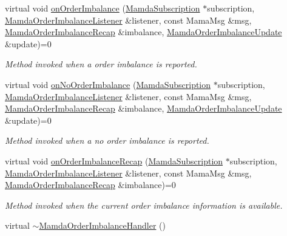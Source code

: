 \begin{CompactItemize}
\item 
virtual void \hyperlink{classWombat_1_1MamdaOrderImbalanceHandler_9c64bc280a746560b36a2a891db8a68f}{on\-Order\-Imbalance} (\hyperlink{classWombat_1_1MamdaSubscription}{Mamda\-Subscription} $\ast$subscription, \hyperlink{classWombat_1_1MamdaOrderImbalanceListener}{Mamda\-Order\-Imbalance\-Listener} \&listener, const Mama\-Msg \&msg, \hyperlink{classWombat_1_1MamdaOrderImbalanceRecap}{Mamda\-Order\-Imbalance\-Recap} \&imbalance, \hyperlink{classWombat_1_1MamdaOrderImbalanceUpdate}{Mamda\-Order\-Imbalance\-Update} \&update)=0
\begin{CompactList}\small\item\em Method invoked when a order imbalance is reported. \item\end{CompactList}\item 
virtual void \hyperlink{classWombat_1_1MamdaOrderImbalanceHandler_f1b804e726d1cb782ebb0e4cbf8461b2}{on\-No\-Order\-Imbalance} (\hyperlink{classWombat_1_1MamdaSubscription}{Mamda\-Subscription} $\ast$subscription, \hyperlink{classWombat_1_1MamdaOrderImbalanceListener}{Mamda\-Order\-Imbalance\-Listener} \&listener, const Mama\-Msg \&msg, \hyperlink{classWombat_1_1MamdaOrderImbalanceRecap}{Mamda\-Order\-Imbalance\-Recap} \&imbalance, \hyperlink{classWombat_1_1MamdaOrderImbalanceUpdate}{Mamda\-Order\-Imbalance\-Update} \&update)=0
\begin{CompactList}\small\item\em Method invoked when a no order imbalance is reported. \item\end{CompactList}\item 
virtual void \hyperlink{classWombat_1_1MamdaOrderImbalanceHandler_4723195ebde988b95b39f58b2ab0b77e}{on\-Order\-Imbalance\-Recap} (\hyperlink{classWombat_1_1MamdaSubscription}{Mamda\-Subscription} $\ast$subscription, \hyperlink{classWombat_1_1MamdaOrderImbalanceListener}{Mamda\-Order\-Imbalance\-Listener} \&listener, const Mama\-Msg \&msg, \hyperlink{classWombat_1_1MamdaOrderImbalanceRecap}{Mamda\-Order\-Imbalance\-Recap} \&imbalance)=0
\begin{CompactList}\small\item\em Method invoked when the current order imbalance information is available. \item\end{CompactList}\item 
virtual \hyperlink{classWombat_1_1MamdaOrderImbalanceHandler_571cd007a222b2bebfe98b86623e9b12}{$\sim$Mamda\-Order\-Imbalance\-Handler} ()
\end{CompactItemize}


